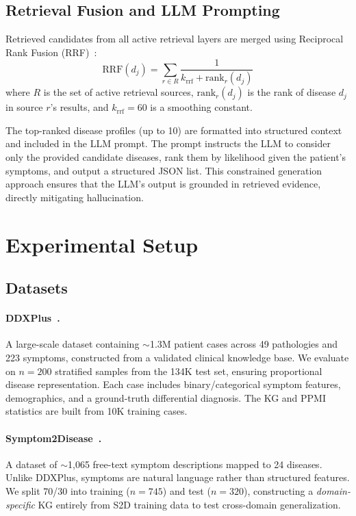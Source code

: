 \documentclass[preprint,12pt]{elsarticle}
\begin{document}
\subsection{Retrieval Fusion and LLM Prompting}
\label{sec:fusion}

Retrieved candidates from all active retrieval layers are merged using Reciprocal Rank Fusion (RRF)~\cite{cormack2009reciprocal}:
\begin{equation}
    \text{RRF}(d_j) = \sum_{r \in R} \frac{1}{k_{\text{rrf}} + \text{rank}_r(d_j)}
\end{equation}
where $R$ is the set of active retrieval sources, $\text{rank}_r(d_j)$ is the rank of disease $d_j$ in source $r$'s results, and $k_{\text{rrf}} = 60$ is a smoothing constant.

The top-ranked disease profiles (up to 10) are formatted into structured context and included in the LLM prompt. The prompt instructs the LLM to consider only the provided candidate diseases, rank them by likelihood given the patient's symptoms, and output a structured JSON list. This constrained generation approach ensures that the LLM's output is grounded in retrieved evidence, directly mitigating hallucination.

\section{Experimental Setup}
\label{sec:experiments}

\subsection{Datasets}

\paragraph{DDXPlus~\cite{fansi2022ddxplus}.} A large-scale dataset containing ${\sim}$1.3M patient cases across 49 pathologies and 223 symptoms, constructed from a validated clinical knowledge base. We evaluate on $n{=}200$ stratified samples from the 134K test set, ensuring proportional disease representation. Each case includes binary/categorical symptom features, demographics, and a ground-truth differential diagnosis. The KG and PPMI statistics are built from 10K training cases.

\paragraph{Symptom2Disease~\cite{gretelai_s2d}.} A dataset of ${\sim}$1,065 free-text symptom descriptions mapped to 24 diseases. Unlike DDXPlus, symptoms are natural language rather than structured features. We split 70/30 into training ($n{=}745$) and test ($n{=}320$), constructing a \emph{domain-specific} KG entirely from S2D training data to test cross-domain generalization.
\end{document}
